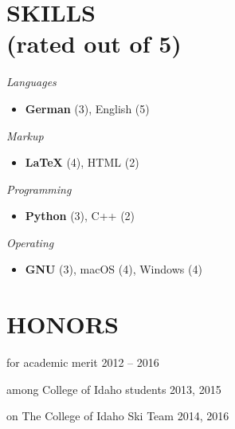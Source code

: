 \documentclass[margin]{res}
\newcommand\cs[1]{\textsl{#1} } \newcommand\ri[1]{\textsl{#1} }
\newenvironment{details}{\begin{itemize}[itemsep=0.6pt,topsep=2.2pt] }{\end{itemize} }
\begin{document}
\begin{resume}
\section{SKILLS\\(rated out of 5)}
\vspace{0pt}
\begin{multicols}{2}
	\parskip=0pt
    \cs{Languages}
    		\begin{details}
            	\item \textbf{German} (3), English (5)
        	\end{details}
    \cs{Markup} 
        	\begin{details}
            	\item \textbf{\LaTeX} (4), HTML (2)
            \end{details}
    \cs{Programming}
        	\begin{details}
            	\item \textbf{Python} (3), C++ (2)
            \end{details}
    \cs{Operating}
        	\begin{details}
            	\item \textbf{GNU} (3), macOS (4), Windows (4)
            \end{details}    
\end{multicols}

\section{HONORS}
\vspace{10pt}
	\begin{description}[noitemsep,topsep=0pt]
		\item[Heritage Scholarship] for academic merit \hfill 2012 -- 2016
    	\item[Top Putnam Score] among College of Idaho students \hfill 2013, 2015
        \item[Varsity Skier] on The College of Idaho Ski Team \hfill 2014, 2016
	\end{description}

\end{resume}
\end{document}
